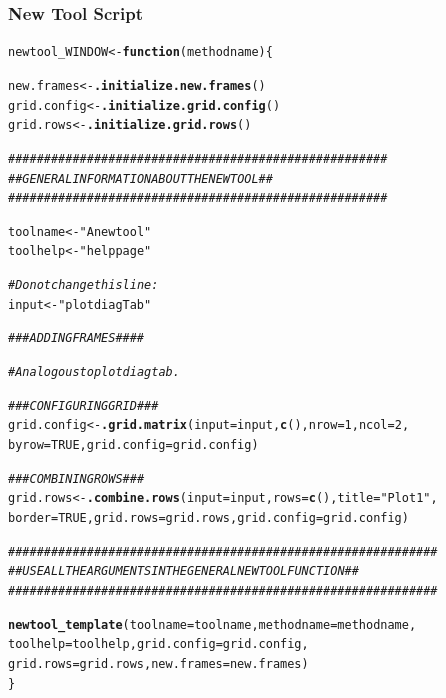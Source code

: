 \documentclass[a4paper]{article}\usepackage[]{graphicx}\usepackage[]{color}
\makeatletter
\newcommand{\hlnum}[1]{\textcolor[rgb]{0.686,0.059,0.569}{#1}}%
\newcommand{\hlstr}[1]{\textcolor[rgb]{0.192,0.494,0.8}{#1}}%
\newcommand{\hlcom}[1]{\textcolor[rgb]{0.678,0.584,0.686}{\textit{#1}}}%
\newcommand{\hlstd}[1]{\textcolor[rgb]{0.345,0.345,0.345}{#1}}%
\newcommand{\hlkwa}[1]{\textcolor[rgb]{0.161,0.373,0.58}{\textbf{#1}}}%
\newcommand{\hlkwb}[1]{\textcolor[rgb]{0.69,0.353,0.396}{#1}}%
\newcommand{\hlkwc}[1]{\textcolor[rgb]{0.333,0.667,0.333}{#1}}%
\newcommand{\hlkwd}[1]{\textcolor[rgb]{0.737,0.353,0.396}{\textbf{#1}}}%
\newenvironment{kframe}{%
 \def\at@end@of@kframe{}%
 \ifinner\ifhmode%
  \def\at@end@of@kframe{\end{minipage}}%
  \begin{minipage}{\columnwidth}%
 \fi\fi%
 \def\FrameCommand##1{\hskip\@totalleftmargin \hskip-\fboxsep
 \colorbox{shadecolor}{##1}\hskip-\fboxsep
     \hskip-\linewidth \hskip-\@totalleftmargin \hskip\columnwidth}%
 \MakeFramed {\advance\hsize-\width
   \@totalleftmargin\z@ \linewidth\hsize
   \@setminipage}}%
 {\par\unskip\endMakeFramed%
 \at@end@of@kframe}
\newenvironment{knitrout}{}{} %
\makeatother
\begin{document}
\subsubsection{New Tool Script}
\begin{knitrout}
\color{fgcolor}\begin{kframe}
\begin{alltt}
\hlstd{newtool_WINDOW} \hlkwb{<-} \hlkwa{function}\hlstd{(}\hlkwc{methodname}\hlstd{)\{}

        \hlstd{new.frames} \hlkwb{<-} \hlkwd{.initialize.new.frames}\hlstd{()}
        \hlstd{grid.config} \hlkwb{<-} \hlkwd{.initialize.grid.config}\hlstd{()}
        \hlstd{grid.rows} \hlkwb{<-} \hlkwd{.initialize.grid.rows}\hlstd{()}

        \hlcom{#####################################################}
        \hlcom{## GENERAL INFORMATION ABOUT THE NEW TOOL		   ##}
        \hlcom{#####################################################}

        \hlstd{toolname} \hlkwb{<-} \hlstr{"A new tool"}
        \hlstd{toolhelp} \hlkwb{<-} \hlstr{"helppage"}

        \hlcom{# Do not change this line:}
        \hlstd{input} \hlkwb{<-} \hlstr{"plotdiagTab"}

        \hlcom{### ADDING FRAMES ####}

        \hlcom{# Analogous to plotdiag tab.}

        \hlcom{### CONFIGURING GRID ###}
        \hlstd{grid.config} \hlkwb{<-} \hlkwd{.grid.matrix}\hlstd{(}\hlkwc{input}\hlstd{=input,}\hlkwd{c}\hlstd{(),}\hlkwc{nrow}\hlstd{=}\hlnum{1}\hlstd{,}\hlkwc{ncol}\hlstd{=}\hlnum{2}\hlstd{,}
           \hlkwc{byrow}\hlstd{=}\hlnum{TRUE}\hlstd{,}\hlkwc{grid.config}\hlstd{=grid.config)}


        \hlcom{### COMBINING ROWS ###}
        \hlstd{grid.rows} \hlkwb{<-} \hlkwd{.combine.rows}\hlstd{(}\hlkwc{input}\hlstd{=input,}\hlkwc{rows}\hlstd{=}\hlkwd{c}\hlstd{(),}\hlkwc{title}\hlstd{=}\hlstr{"Plot 1"}\hlstd{,}
           \hlkwc{border}\hlstd{=}\hlnum{TRUE}\hlstd{,}\hlkwc{grid.rows}\hlstd{=grid.rows,}\hlkwc{grid.config}\hlstd{=grid.config)}

        \hlcom{############################################################}
        \hlcom{## USE ALL THE ARGUMENTS IN THE GENERAL NEW TOOL FUNCTION ##}
        \hlcom{############################################################}

        \hlkwd{newtool_template}\hlstd{(}\hlkwc{toolname}\hlstd{=toolname,}\hlkwc{methodname}\hlstd{=methodname,}
           \hlkwc{toolhelp}\hlstd{=toolhelp,}\hlkwc{grid.config}\hlstd{=grid.config,}
           \hlkwc{grid.rows}\hlstd{=grid.rows,}\hlkwc{new.frames}\hlstd{=new.frames)}
\hlstd{\}}
\end{alltt}
\end{kframe}
\end{knitrout}
\end{document}
